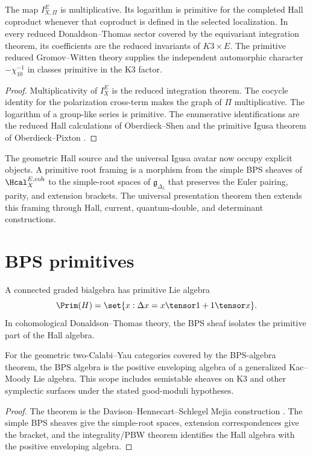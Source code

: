 \begin{theorem}
The map $I_{X,\Pi}^E$ is multiplicative.  Its logarithm is primitive for the completed Hall coproduct whenever that coproduct is defined in the selected localization.  In every reduced Donaldson--Thomas sector covered by the equivariant integration theorem, its coefficients are the reduced invariants of $K3\times E$.  The primitive reduced Gromov--Witten theory supplies the independent automorphic character $-\chi_{10}^{-1}$ in classes primitive in the K3 factor.
\end{theorem}
\begin{proof}
Multiplicativity of $I_X^E$ is the reduced integration theorem.  The cocycle identity for the polarization cross-term makes the graph of $\Pi$ multiplicative.  The logarithm of a group-like series is primitive.  The enumerative identifications are the reduced Hall calculations of Oberdieck--Shen and the primitive Igusa theorem of Oberdieck--Pixton \cite{OberdieckShen,OP}.
\end{proof}

The geometric Hall source and the universal Igusa avatar now occupy explicit objects.  A primitive root framing is a morphism from the simple BPS sheaves of $\Hcal_X^{E,\mathrm{coh}}$ to the simple-root spaces of $\mathfrak g_{\Delta_5}$ that preserves the Euler pairing, parity, and extension brackets.  The universal presentation theorem then extends this framing through Hall, current, quantum-double, and determinant constructions.

\chapter{BPS primitives}
A connected graded bialgebra has primitive Lie algebra
\[
 \Prim(H)=\set{x:\Delta x=x\tensor1+1\tensor x}.
\]
In cohomological Donaldson--Thomas theory, the BPS sheaf isolates the primitive part of the Hall algebra.

\begin{theorem}
For the geometric two-Calabi--Yau categories covered by the BPS-algebra theorem, the BPS algebra is the positive enveloping algebra of a generalized Kac--Moody Lie algebra. This scope includes semistable sheaves on K3 and other symplectic surfaces under the stated good-moduli hypotheses.
\end{theorem}
\begin{proof}
The theorem is the Davison--Hennecart--Schlegel Mejia construction \cite{DHS}. The simple BPS sheaves give the simple-root spaces, extension correspondences give the bracket, and the integrality/PBW theorem identifies the Hall algebra with the positive enveloping algebra.
\end{proof}

